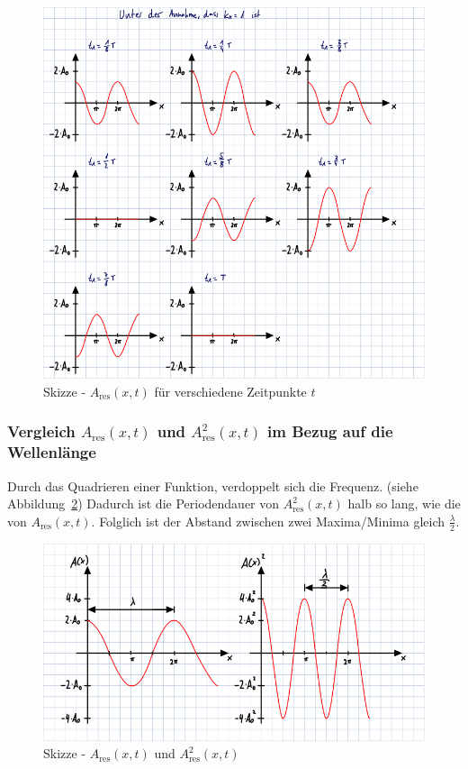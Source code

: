 \documentclass[a4paper]{scrartcl}
\numberwithin{equation}{subsection}
\begin{document}
\begin{figure}[H]
\includegraphics[width=12cm]{Skizze_Stehende_Welle}
\centering
\caption{Skizze - $A_{\text{res}}(x,t)$ für verschiedene Zeitpunkte $t$}
\centering
\label{fig:skizzeStehendeWelle}
\end{figure}

\subsubsection{Vergleich $A_{\text{res}}(x,t)$ und $A_{\text{res}}^2(x,t)$ im Bezug auf die Wellenlänge}
\label{sec:Faktor4}
Durch das Quadrieren einer Funktion, verdoppelt sich die Frequenz. (siehe Abbildung~\ref{fig:skizzeStehendeWelleQ}) Dadurch ist die Periodendauer von $A_{\text{res}}^2(x,t)$ halb so lang, wie die von $A_{\text{res}}(x,t)$. Folglich ist der Abstand zwischen zwei Maxima/Minima gleich $\frac{\lambda}{2}$.

\begin{figure}[H]
\includegraphics[width=12cm]{Skizze_Stehende_Welle_q}
\centering
\caption{Skizze - $A_{\text{res}}(x,t)$ und $A_{\text{res}}^2(x,t)$}
\centering
\label{fig:skizzeStehendeWelleQ}
\end{figure}
\end{document}
